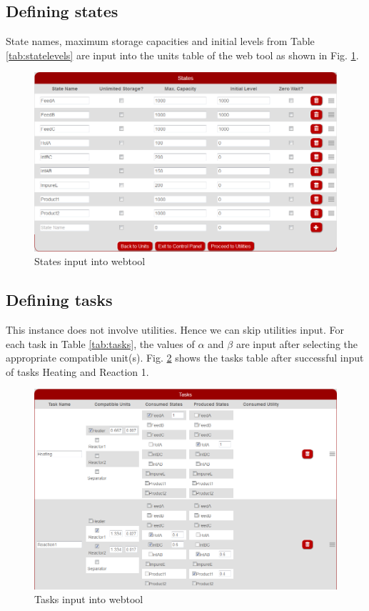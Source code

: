 \subsection{Defining states}

State names, maximum storage capacities and initial levels from Table \ref{tab:statelevels} are input into the units table of the web tool as shown in Fig. \ref{fig:defStates}.

\begin{figure}[htbp]
\centering
\includegraphics[width=\linewidth]{Images/DefineStates.png}
\caption{States input into webtool}
\label{fig:defStates}
\end{figure}

\subsection{Defining tasks}

This instance does not involve utilities. Hence we can skip utilities input. For each task in Table \ref{tab:tasks}, the values of $\alpha$ and $\beta$ are input after selecting the appropriate compatible unit(s). Fig. \ref{fig:defTasks} shows the tasks table after successful input of tasks Heating and Reaction 1.

\begin{figure}[htbp]
\centering
\includegraphics[width=\linewidth]{Images/DefineTasks.png}
\caption{Tasks input into webtool}
\label{fig:defTasks}
\end{figure}

